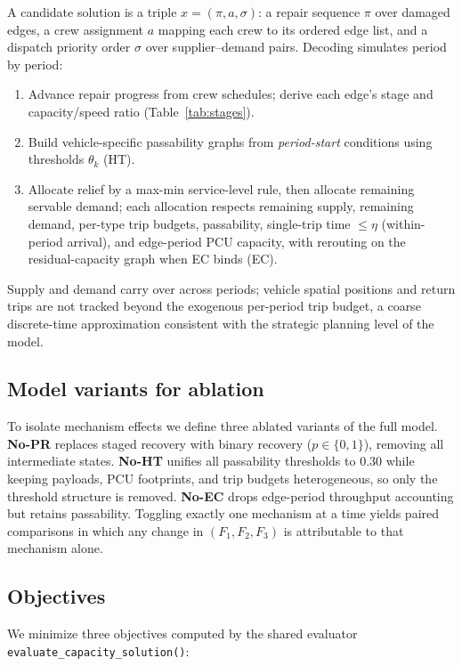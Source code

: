 \documentclass[10pt,conference,letterpaper]{IEEEtran}
\begin{document}
A candidate solution is a triple $x=(\pi,a,\sigma)$: a repair sequence
$\pi$ over damaged edges, a crew assignment $a$ mapping each crew to its
ordered edge list, and a dispatch priority order $\sigma$ over
supplier--demand pairs. Decoding simulates period by period:

\begin{enumerate}
\item Advance repair progress from crew schedules; derive each edge's
stage and capacity/speed ratio (Table~\ref{tab:stages}).
\item Build vehicle-specific passability graphs from \emph{period-start}
conditions using thresholds $\theta_k$ (HT).
\item Allocate relief by a max-min service-level rule, then allocate
remaining servable demand; each allocation respects remaining supply,
remaining demand, per-type trip budgets, passability, single-trip time
$\le\eta$ (within-period arrival), and edge-period PCU capacity, with
rerouting on the residual-capacity graph when EC binds (EC).
\end{enumerate}

Supply and demand carry over across periods; vehicle spatial positions
and return trips are not tracked beyond the exogenous per-period trip
budget, a coarse discrete-time approximation consistent with the
strategic planning level of the model.

\subsection{Model variants for ablation}

To isolate mechanism effects we define three ablated variants of the
full model. \textbf{No-PR} replaces staged recovery with binary
recovery ($p\in\{0,1\}$), removing all intermediate states.
\textbf{No-HT} unifies all passability thresholds to $0.30$ while keeping
payloads, PCU footprints, and trip budgets heterogeneous, so only the
threshold structure is removed. \textbf{No-EC} drops edge-period
throughput accounting but retains passability. Toggling exactly one
mechanism at a time yields paired comparisons in which any change in
$(F_1,F_2,F_3)$ is attributable to that mechanism alone.

\subsection{Objectives}

We minimize three objectives computed by the shared evaluator
\texttt{evaluate\_capacity\_solution()}:
\end{document}
